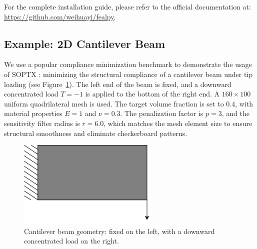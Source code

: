 \documentclass[mathpazo]{cicp}
\begin{document}
For the complete installation guide, please refer to the official documentation at: \url{https://github.com/weihuayi/fealpy}.

\subsection{Example: 2D Cantilever Beam}\label{sec:exp_canti_beam}
We use a popular compliance minimization benchmark to demonstrate the usage of SOPTX \cite{bendsoe2013topology}: minimizing the structural compliance of a cantilever beam under tip loading (see Figure~\ref{fig:cantilever}). The left end of the beam is fixed, and a downward concentrated load $T = -1$ is applied to the bottom of the right end. A $160 \times 100$ uniform quadrilateral mesh is used. The target volume fraction is set to $0.4$, with material properties $E = 1$ and $\nu = 0.3$. The penalization factor is $p = 3$, and the sensitivity filter radius is $r = 6.0$, which matches the mesh element size to ensure structural smoothness and eliminate checkerboard patterns.
\begin{figure}[htp]
	\centering
	\includegraphics[width=0.6\textwidth]{figures/cantilever_2d.png}
	\caption{Cantilever beam geometry: fixed on the left, with a downward concentrated load on the right.}
	\label{fig:cantilever}
\end{figure}
\end{document}
